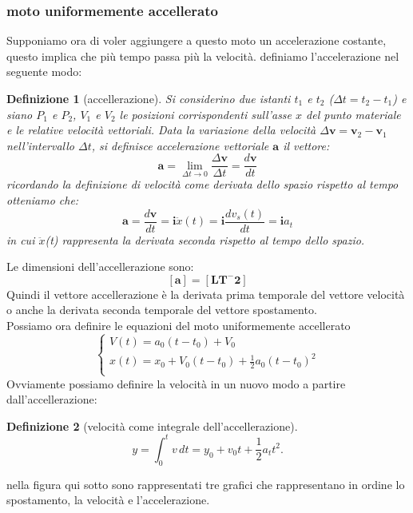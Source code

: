 \documentclass[a4paper,11pt,oneside]{book}
\theoremstyle{dispense}
\newtheorem{definizione}{Definizione}[chapter]
\begin{document}
\subsubsection{moto uniformemente accellerato}
Supponiamo ora di voler aggiungere a questo moto un accelerazione costante, questo implica che più tempo passa più la velocità. definiamo l'accelerazione nel seguente modo:
\begin{tcolorbox}
\begin{definizione}[accellerazione]
Si considerino due istanti $t_1$ e $t_2$ ($\Delta t = t_2 - t_1$) e siano $P_1$ e $P_2$, $V_1$ e $V_2$ le posizioni corrispondenti sull'asse $x$ del punto materiale e le relative velocità vettoriali. Data la variazione della velocità $\Delta \mathbf{v} = \mathbf{v}_2 - \mathbf{v}_1$ nell'intervallo $\Delta t$, si definisce accelerazione vettoriale $\mathbf{a}$ il vettore:
\[
  \mathbf{a} = \lim_{\Delta t \to 0} \frac{\Delta \mathbf{v}}{\Delta t} = \frac{d\mathbf{v}}{dt}
\]
ricordando la definizione di velocità come derivata dello spazio rispetto al tempo otteniamo che:
\[
  \mathbf{a} = \frac{d\mathbf{v}}{dt} = \mathbf{i} \ddot{x}(t) = \mathbf{i} \frac{dv_s(t)}{dt} = \mathbf{i} a_t
\]
in cui $\ddot{x}$(t) rappresenta la derivata seconda rispetto al tempo dello spazio.
\end{definizione}
\end{tcolorbox}
Le dimensioni dell'accellerazione sono:\\
\[
  \bm{[a]=[LT^-2]}
\]
Quindi il vettore accellerazione è la derivata prima temporale del vettore velocità o anche la derivata seconda temporale del vettore spostamento.
\\
Possiamo ora definire le equazioni del moto uniformemente accellerato
\begin{equation}
\begin{cases}
V(t)=a_0(t-t_0)+V_0\\
x(t)=x_0 + V_0(t-t_0)+ \frac{1}{2}a_0(t-t_0)^2\\

\end{cases}
\end{equation}
Ovviamente possiamo definire la velocità in un nuovo modo a partire dall'accellerazione:
\begin{tcolorbox}
\begin{definizione}[velocità come integrale dell'accellerazione]
\[
  y = \int_{0}^{t} v \, dt = y_0 + v_0 t + \frac{1}{2} a_t t^2.
\]
\end{definizione}
\end{tcolorbox}
\newpage
nella figura qui sotto sono rappresentati tre grafici che rappresentano in ordine lo spostamento, la velocità e l'accelerazione.\\
\end{document}
